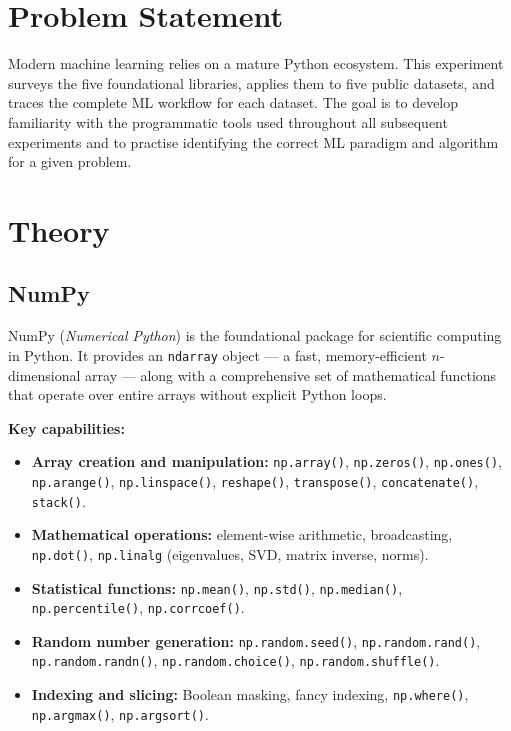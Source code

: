 \documentclass[12pt,a4paper]{article}
\begin{document}
\section{Problem Statement}
Modern machine learning relies on a mature Python ecosystem. This experiment surveys the five
foundational libraries, applies them to five public datasets, and traces the complete ML workflow
for each dataset. The goal is to develop familiarity with the programmatic tools used throughout
all subsequent experiments and to practise identifying the correct ML paradigm and algorithm for
a given problem.

\section{Theory}

\subsection{NumPy}

NumPy (\textit{Numerical Python}) is the foundational package for scientific computing in Python.
It provides an \texttt{ndarray} object --- a fast, memory-efficient $n$-dimensional array ---
along with a comprehensive set of mathematical functions that operate over entire arrays without
explicit Python loops.

\textbf{Key capabilities:}
\begin{itemize}[noitemsep]
  \item \textbf{Array creation and manipulation:} \texttt{np.array()}, \texttt{np.zeros()},
        \texttt{np.ones()}, \texttt{np.arange()}, \texttt{np.linspace()},
        \texttt{reshape()}, \texttt{transpose()}, \texttt{concatenate()}, \texttt{stack()}.
  \item \textbf{Mathematical operations:} element-wise arithmetic, broadcasting,
        \texttt{np.dot()}, \texttt{np.linalg} (eigenvalues, SVD, matrix inverse, norms).
  \item \textbf{Statistical functions:} \texttt{np.mean()}, \texttt{np.std()},
        \texttt{np.median()}, \texttt{np.percentile()}, \texttt{np.corrcoef()}.
  \item \textbf{Random number generation:} \texttt{np.random.seed()},
        \texttt{np.random.rand()}, \texttt{np.random.randn()},
        \texttt{np.random.choice()}, \texttt{np.random.shuffle()}.
  \item \textbf{Indexing and slicing:} Boolean masking, fancy indexing,
        \texttt{np.where()}, \texttt{np.argmax()}, \texttt{np.argsort()}.
\end{itemize}
\end{document}
